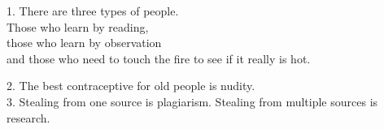 \documentclass[11pt, letter]{article}
\begin{document}
1. There are three types of people.\\
Those who learn by reading, \\
those who learn by observation\\
and those who need to touch the fire to see if it really is hot.

2. The best contraceptive for old people is nudity.\\

3. Stealing from one source is plagiarism. Stealing from multiple sources is
research.
\end{document}
